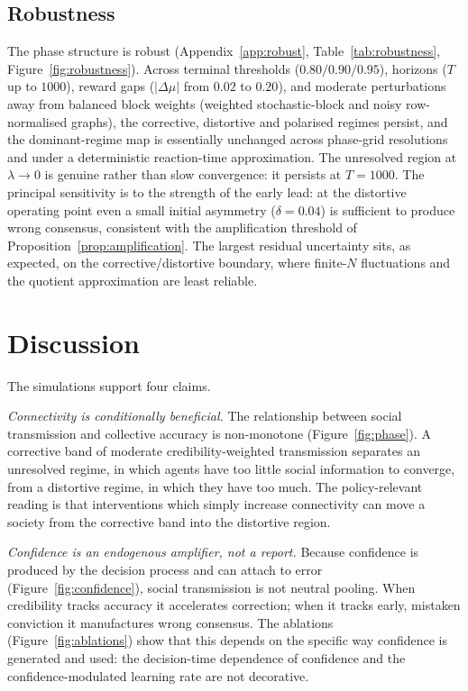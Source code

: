 \documentclass[11pt]{article}
\newcommand{\1}{\mathbf{1}}
\begin{document}
\subsection{Robustness}
\label{sec:results-robustness}
The phase structure is robust (Appendix~\ref{app:robust},
Table~\ref{tab:robustness}, Figure~\ref{fig:robustness}). Across terminal
thresholds ($0.80/0.90/0.95$), horizons ($T$ up to $1000$), reward gaps
($|\Delta\mu|$ from $0.02$ to $0.20$), and moderate perturbations away from
balanced block weights (weighted stochastic-block and noisy row-normalised
graphs), the corrective, distortive and polarised regimes persist, and the
dominant-regime map is essentially unchanged across phase-grid resolutions and
under a deterministic reaction-time approximation. The unresolved region at
$\lambda\to0$ is genuine rather than slow convergence: it persists at $T=1000$.
The principal sensitivity is to the strength of the early lead: at the distortive
operating point even a small initial asymmetry ($\delta=0.04$) is sufficient to
produce wrong consensus, consistent with the amplification threshold of
Proposition~\ref{prop:amplification}. The largest residual uncertainty sits, as
expected, on the corrective/distortive boundary, where finite-$N$ fluctuations
and the quotient approximation are least reliable.



\section{Discussion}
\label{sec:discussion}

The simulations support four claims.

\emph{Connectivity is conditionally beneficial.} The relationship between
social transmission and collective accuracy is non-monotone
(Figure~\ref{fig:phase}). A corrective band of moderate credibility-weighted
transmission separates an unresolved regime, in which agents have too little
social information to converge, from a distortive regime, in which they have too
much. The policy-relevant reading is that interventions which simply increase
connectivity can move a society from the corrective band into the distortive
region.

\emph{Confidence is an endogenous amplifier, not a report.} Because confidence
is produced by the decision process and can attach to error
(Figure~\ref{fig:confidence}), social transmission is not neutral pooling. When
credibility tracks accuracy it accelerates correction; when it tracks early,
mistaken conviction it manufactures wrong consensus. The ablations
(Figure~\ref{fig:ablations}) show that this depends on the specific way
confidence is generated and used: the decision-time dependence of confidence and
the confidence-modulated learning rate are not decorative.
\end{document}
